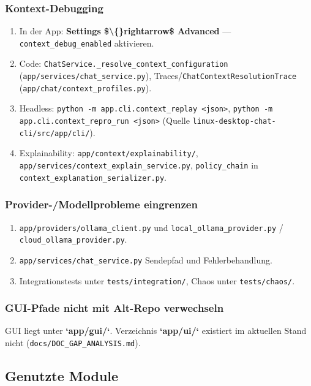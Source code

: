 \subsubsection{Kontext-Debugging}

\begin{enumerate}
\item In der App: \textbf{Settings \$\textbackslash\{\}rightarrow\$ Advanced} --- \texttt{context\_debug\_enabled} aktivieren.
\item Code: \texttt{ChatService.\_resolve\_context\_configuration} (\texttt{app/services/chat\_service.py}), Traces/\texttt{ChatContextResolutionTrace} (\texttt{app/chat/context\_profiles.py}).
\item Headless: \texttt{python -m app.cli.context\_replay <json>}, \texttt{python -m app.cli.context\_repro\_run <json>} (Quelle \texttt{linux-desktop-chat-cli/src/app/cli/}).
\item Explainability: \texttt{app/context/explainability/}, \texttt{app/services/context\_explain\_service.py}, \texttt{policy\_chain} in \texttt{context\_explanation\_serializer.py}.
\end{enumerate}

\subsubsection{Provider-/Modellprobleme eingrenzen}

\begin{enumerate}
\item \texttt{app/providers/ollama\_client.py} und \texttt{local\_ollama\_provider.py} / \texttt{cloud\_ollama\_provider.py}.
\item \texttt{app/services/chat\_service.py} Sendepfad und Fehlerbehandlung.
\item Integrationstests unter \texttt{tests/integration/}, Chaos unter \texttt{tests/chaos/}.
\end{enumerate}

\subsubsection{GUI-Pfade nicht mit Alt-Repo verwechseln}

GUI liegt unter \textbf{`app/gui/`}. Verzeichnis \textbf{`app/ui/`} existiert im aktuellen Stand nicht (\texttt{docs/DOC\_GAP\_ANALYSIS.md}).

\subsection{Genutzte Module}

